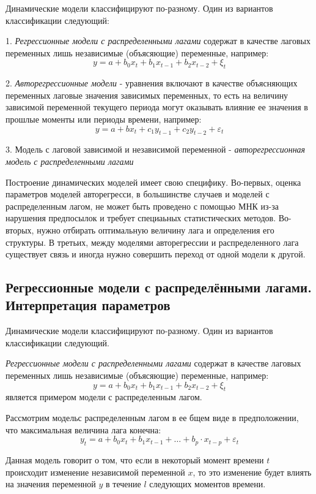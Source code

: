 \documentclass[aps,%
12pt,%
final,%
oneside,
onecolumn,%
musixtex, %
superscriptaddress,%
centertags]{article} %
\theoremstyle{plain}
\theoremstyle{definition}
\theoremstyle{remark}
\begin{document}
Динамические модели классифицируют по-разному. Один из вариантов классификации следующий:

1. \textit{Регрессионные модели с распределенными лагами} содержат в качестве лаговых переменных лишь независимые (объясяющие) переменные, например:
$$y = a + b_0x_t + b_1x_{t-1} + b_2x_{t-2} + \xi_t$$

2. \textit{Авторегрессионные модели} - уравнения включают в качестве объясняющих переменных лаговые значения зависимых переменных,  то есть на величину зависимой переменной текущего периода могут оказывать влияние ее значения в прошлые моменты или периоды времени, например:
$$y = a + bx_t + c_1y_{t-1} + c_2y_{t-2} + \varepsilon_t$$

3. Модель с лаговой зависимой и независимой переменной - \textit{авторегрессионная модель с распределенными лагами}

Построение динамических моделей имеет свою специфику. Во-первых, оценка параметров моделей авторегресси, в большинстве случаев и моделей с распределенным лагом, не может быть проведено с помощью МНК из-за нарушения предпосылок и требует специаьных статистических методов. Во-вторых, нужно отбирать оптимальную величину лага и определения его структуры. В третьих, между моделями авторегрессии и распределенного лага существует связь и иногда нужно совершить переход от одной модели к другой.

\newpage
\subsection{Регрессионные модели с распределёнными лагами. Интерпретация параметров}

Динамические модели классифицируют по-разному. Один из вариантов классификации следующий.

\textit{Регрессионные модели с распределенными лагами} содержат в качестве лаговых переменных лишь независимые (объясяющие) переменные, например:
$$y = a + b_0x_t + b_1x_{t-1} + b_2x_{t-2} + \xi_t$$
является примером модели с распределенным лагом.

Рассмотрим модельс распределенным лагом в ее бщем виде в предположении, что максимальная величина лага конечна:
$$y_t = a + b_0x_t + b_1x_{t-1} + \ldots + b_p \cdot x_{t-p} + \varepsilon_t$$

Данная модель говорит о том, что если в некоторый момент времени $t$ происходит изменение независимой переменной $x$, то это изменение будет влиять на значения переменной $y$ в течение $l$ следующих моментов времени.
\end{document}
